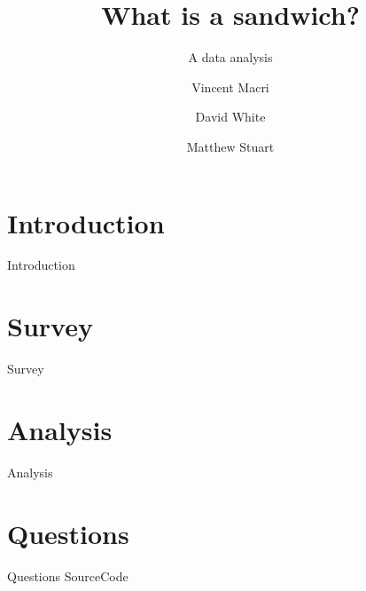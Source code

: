 

\title{What is a sandwich?}
\subtitle{A data analysis}
\author{Vincent Macri \and David White \and Matthew Stuart}


	\maketitle
	
	\tableofcontents
	\clearpage
	\part{Introduction}\label{part:introduction}
		{Introduction}
	\part{Survey}\label{part:survey}
		{Survey}
	\part{Analysis}\label{part:analysis}
		{Analysis}
	\appendix
	\part{Questions}\label{part:appendix}
		{Questions}
		{SourceCode}
	\nocite{*}
	\printbibliography

